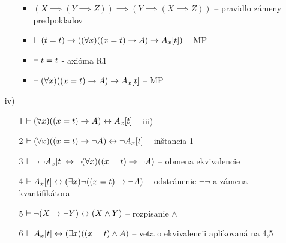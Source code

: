 \begin{dokaz}
\begin{itemize}
\begin{itemize}
\begin{itemize}
                \item $(X \implies (Y \implies Z)) \implies
                       (Y \implies (X \implies Z))$ -- pravidlo zámeny
                       predpokladov

                \item $\vdash (t=t) \rightarrow ((\forall x) ((x=t)
                    \rightarrow A) \rightarrow A_x[t])$ -- MP

                \item $\vdash t=t$ - axióma R1

                \item $\vdash (\forall x) ((x=t)
                    \rightarrow A) \rightarrow A_x[t]$ -- MP
                \end{itemize}
            \end{itemize}
        \item[iv)]
            \begin{itemize}
            \item[1] $\vdash (\forall x)((x=t) \rightarrow A)
                \leftrightarrow A_x[t]$ -- iii)
            \item[2] $\vdash (\forall x)((x=t) \rightarrow \neg A)
                \leftrightarrow \neg A_x[t]$ -- inštancia 1
            \item[3] $\vdash \neg \neg A_x[t] \leftrightarrow
                \neg (\forall x) ((x=t) \rightarrow \neg A)$ -- obmena
                ekvivalencie
            \item[4] $\vdash A_x[t] \leftrightarrow (\exists x) \neg
                ((x=t) \rightarrow \neg A)$ -- odstránenie $\neg \neg$ a
                zámena kvantifikátora
            \item[5] $\vdash \neg(X \rightarrow \neg Y)
                \leftrightarrow  (X \land Y)$ -- rozpísanie
                $\land$
            \item[6] $\vdash A_x[t] \leftrightarrow (\exists x)
                ((x=t) \land A)$ -- veta o ekvivalencii aplikovaná na
                4,5

            \end{itemize}
    \end{itemize}
\end{dokaz}


